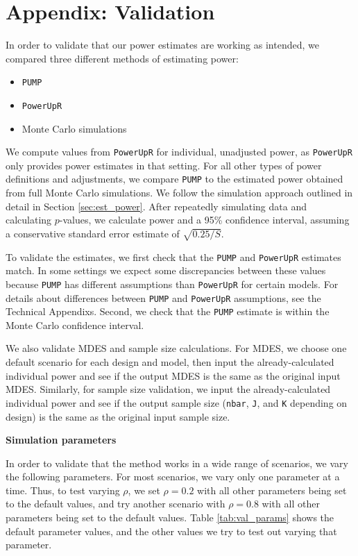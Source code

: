 \documentclass{article}
\providecommand{\tightlist}{%
  \setlength{\itemsep}{0pt}\setlength{\parskip}{0pt}}
\begin{document}
\section*{Appendix: Validation}

In order to validate that our power estimates are working as intended,
we compared three different methods of estimating power:

\begin{itemize}
\tightlist
\item
  \texttt{PUMP}
\item
  \texttt{PowerUpR}
\item
  Monte Carlo simulations
\end{itemize}

We compute values from \texttt{PowerUpR} for individual, unadjusted
power, as \texttt{PowerUpR} only provides power estimates in that
setting. For all other types of power definitions and adjustments, we
compare \texttt{PUMP} to the estimated power obtained from full Monte
Carlo simulations. We follow the simulation approach outlined in detail
in Section \ref{sec:est_power}. After repeatedly simulating data and
calculating \(p\)-values, we calculate power and a 95\% confidence
interval, assuming a conservative standard error estimate of
\(\sqrt{0.25/S}\).

To validate the estimates, we first check that the \texttt{PUMP} and
\texttt{PowerUpR} estimates match. In some settings we expect some
discrepancies between these values because \texttt{PUMP} has different
assumptions than \texttt{PowerUpR} for certain models. For details about
differences between \texttt{PUMP} and \texttt{PowerUpR} assumptions, see
the Technical Appendixs. Second, we check that the \texttt{PUMP}
estimate is within the Monte Carlo confidence interval.

We also validate MDES and sample size calculations. For MDES, we choose
one default scenario for each design and model, then input the
already-calculated individual power and see if the output MDES is the
same as the original input MDES. Similarly, for sample size validation,
we input the already-calculated individual power and see if the output
sample size (\texttt{nbar}, \texttt{J}, and \texttt{K} depending on
design) is the same as the original input sample size.

\textbf{Simulation parameters}

In order to validate that the method works in a wide range of scenarios,
we vary the following parameters. For most scenarios, we vary only one
parameter at a time. Thus, to test varying \(\rho\), we set
\(\rho = 0.2\) with all other parameters being set to the default
values, and try another scenario with \(\rho = 0.8\) with all other
parameters being set to the default values. Table \ref{tab:val_params}
shows the default parameter values, and the other values we try to test
out varying that parameter.
\end{document}
